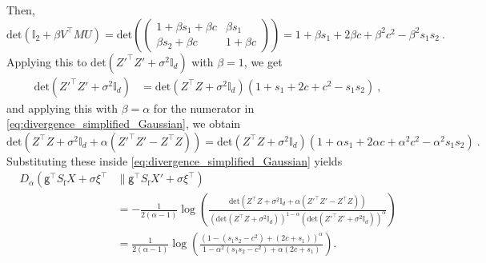 \documentclass[11pt]{article}
\theoremstyle{definition}
\theoremstyle{plain}
\providecommand{\brI}{\mathbb{I}}
\newcommand{\deter}[1]{\mathrm{det}\left(#1 \right)}
\providecommand{\KLDA}[2]{{D_{\alpha} \left( #1 \middle\| #2 \right)}}
\begin{document}
Then,
\begin{equation}
    \deter{\brI_2 + \beta V^{\top}MU} = \deter{\begin{pmatrix}  1 + \beta s_1 + \beta c & \beta s_1 \\
                        \beta s_2 + \beta c & 1 + \beta c
            \end{pmatrix}} = 1 + \beta s_1 + 2\beta c + \beta^{2} c^2 - \beta^{2} s_1s_2~.
\end{equation}
Applying this to \(\deter{Z'^{\top}Z' + \sigma^{2}\brI_{d}}\) with \(\beta = 1\), we get
\begin{align}
    \deter{Z'^{\top}Z' + \sigma^2\brI_d} &= \deter{Z^{\top}Z + \sigma^2\brI_d}\left(1 + s_1 + 2c + c^2 - s_1s_2\right)~,
\end{align}
and applying this with \(\beta = \alpha\) for the numerator in \eqref{eq:divergence_simplified_Gaussian}, we obtain
\begin{equation}
    \label{eq:determinant_lemma_3}
    \deter{Z^{\top}Z + \sigma^2\brI_d + \alpha (Z'^{\top}Z' - Z^{\top}Z)} = \deter{Z^{\top}Z + \sigma^2\brI_d}\left(1 + \alpha s_1 + 2\alpha c + \alpha^{2} c^2 - \alpha^{2} s_1s_2 \right)~.
\end{equation}
Substituting these inside \eqref{eq:divergence_simplified_Gaussian} yields
\begin{align}
    D_{\alpha}\left(\mathsf{g}^{\top}S_{\mathrm{f}}X + \sigma \xi^{\top}\right. &\| \left.\mathsf{g}^{\top}S_{\mathrm{f}}X' + \sigma \xi^{\top}\right) \\
    &= 
    -\frac{1}{2(\alpha - 1)} \log \left(\frac{\deter{Z^{\top}Z + \sigma^2\brI_d + \alpha(Z'^{\top}Z' - Z^{\top}Z)}}{\left(\deter{Z^{\top}Z + \sigma^2\brI_d}\right)^{1-\alpha}\left(\deter{Z'^{\top}Z' + \sigma^2\brI_d}\right)^{\alpha}}\right)\\
    \label{eq:divergence_final_Gaussian}
    &=  \frac{1}{2(\alpha - 1)} \log \left(\frac{\left(1 - (s_1s_2 - c^2) + \left(2c + s_1\right)\right)^{\alpha}}{1 - \alpha^2\left(s_1s_2 - c^2\right) + \alpha \left(2c + s_1\right)}\right).
\end{align}
\end{document}
